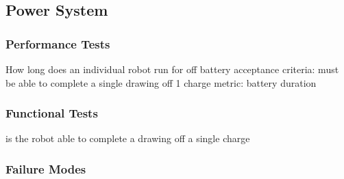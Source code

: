 
\subsection{Power System}
\label{sec:verification_power}


\subsubsection{Performance Tests}
\label{sec:power_pt}

How long does an individual robot run for off battery
acceptance criteria: must be able to complete a single drawing off 1 charge
metric: battery duration

\subsubsection{Functional Tests}
\label{sec:power_ft}

is the robot able to complete a drawing off a single charge

\subsubsection{Failure Modes}
\label{sec:power_fm}

